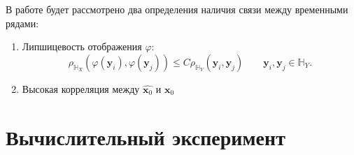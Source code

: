 \documentclass[a4paper,14pt]{article}
\renewcommand{\leq}{\ensuremath{\leqslant}}
\newcommand{\bx}{\mathbf{x}}
\newcommand{\by}{\mathbf{y}}
\newcommand{\dH}{\mathbb{H}}
\theoremstyle{plain} %
\theoremstyle{definition} %
\theoremstyle{remark} %
\begin{document}
	В работе будет рассмотрено два определения наличия связи между временными рядами:
	\begin{enumerate}
		\item Липшицевость отображения $\varphi$:
		$$\rho_{\dH_X}(\varphi(\by_i), \varphi(\by_j)) \leq C \rho_{\dH_Y}(\by_i, \by_j) \qquad \by_i, \by_j \in \dH_Y. $$
		\item Высокая корреляция между $\widehat{\bx_0}$ и $\bx_0$
	\end{enumerate} 
	
	\section{Вычислительный эксперимент}
	\begin{figure}
		\centering

\end{figure}
\end{document}
